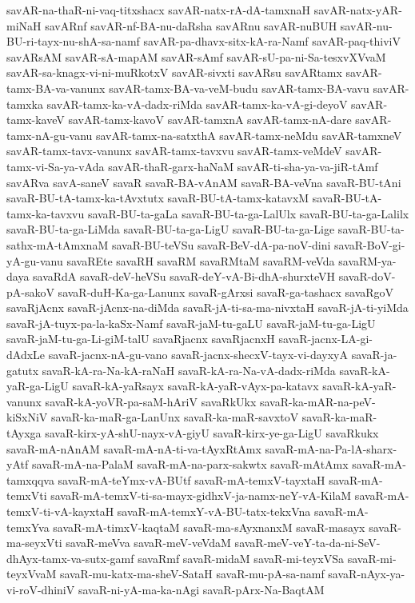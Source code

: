 {savAR-na-thaR-ni-vaq-titxshacx
savAR-natx-rA-dA-tamxnaH
savAR-natx-yAR-miNaH
savARnf
savAR-nf-BA-nu-daRsha
savARnu
savAR-nuBUH
savAR-nu-BU-ri-tayx-nu-shA-sa-namf
savAR-pa-dhavx-sitx-kA-ra-Namf
savAR-paq-thiviV
savARsAM
savAR-sA-mapAM
savAR-sAmf
savAR-sU-pa-ni-Sa-tesxvXVvaM
savAR-sa-knagx-vi-ni-muRkotxV
savAR-sivxti
savARsu
savARtamx
savAR-tamx-BA-va-vanunx
savAR-tamx-BA-va-veM-budu
savAR-tamx-BA-vavu
savAR-tamxka
savAR-tamx-ka-vA-dadx-riMda
savAR-tamx-ka-vA-gi-deyoV
savAR-tamx-kaveV
savAR-tamx-kavoV
savAR-tamxnA
savAR-tamx-nA-dare
savAR-tamx-nA-gu-vanu
savAR-tamx-na-satxthA
savAR-tamx-neMdu
savAR-tamxneV
savAR-tamx-tavx-vanunx
savAR-tamx-tavxvu
savAR-tamx-veMdeV
savAR-tamx-vi-Sa-ya-vAda
savAR-thaR-garx-haNaM
savAR-ti-sha-ya-va-jiR-tAmf
savARva
savA-saneV
savaR
savaR-BA-vAnAM
savaR-BA-veVna
savaR-BU-tAni
savaR-BU-tA-tamx-ka-tAvxtutx
savaR-BU-tA-tamx-katavxM
savaR-BU-tA-tamx-ka-tavxvu
savaR-BU-ta-gaLa
savaR-BU-ta-ga-LalUlx
savaR-BU-ta-ga-Lalilx
savaR-BU-ta-ga-LiMda
savaR-BU-ta-ga-LigU
savaR-BU-ta-ga-Lige
savaR-BU-ta-sathx-mA-tAmxnaM
savaR-BU-teVSu
savaR-BeV-dA-pa-noV-dini
savaR-BoV-gi-yA-gu-vanu
savaREte
savaRH
savaRM
savaRMtaM
savaRM-veVda
savaRM-ya-daya
savaRdA
savaR-deV-heVSu
savaR-deY-vA-Bi-dhA-shurxteVH
savaR-doV-pA-sakoV
savaR-duH-Ka-ga-Lanunx
savaR-gArxsi
savaR-ga-tashacx
savaRgoV
savaRjAcnx
savaR-jAcnx-na-diMda
savaR-jA-ti-sa-ma-nivxtaH
savaR-jA-ti-yiMda
savaR-jA-tuyx-pa-la-kaSx-Namf
savaR-jaM-tu-gaLU
savaR-jaM-tu-ga-LigU
savaR-jaM-tu-ga-Li-giM-talU
savaRjacnx
savaRjacnxH
savaR-jacnx-LA-gi-dAdxLe
savaR-jacnx-nA-gu-vano
savaR-jacnx-shecxV-tayx-vi-dayxyA
savaR-ja-gatutx
savaR-kA-ra-Na-kA-raNaH
savaR-kA-ra-Na-vA-dadx-riMda
savaR-kA-yaR-ga-LigU
savaR-kA-yaRsayx
savaR-kA-yaR-vAyx-pa-katavx
savaR-kA-yaR-vanunx
savaR-kA-yoVR-pa-saM-hAriV
savaRkUkx
savaR-ka-mAR-na-peV-kiSxNiV
savaR-ka-maR-ga-LanUnx
savaR-ka-maR-savxtoV
savaR-ka-maR-tAyxga
savaR-kirx-yA-shU-nayx-vA-giyU
savaR-kirx-ye-ga-LigU
savaRkukx
savaR-mA-nAnAM
savaR-mA-nA-ti-va-tAyxRtAmx
savaR-mA-na-Pa-lA-sharx-yAtf
savaR-mA-na-PalaM
savaR-mA-na-parx-sakwtx
savaR-mAtAmx
savaR-mA-tamxqqva
savaR-mA-teYmx-vA-BUtf
savaR-mA-temxV-tayxtaH
savaR-mA-temxVti
savaR-mA-temxV-ti-sa-mayx-gidhxV-ja-namx-neY-vA-KilaM
savaR-mA-temxV-ti-vA-kayxtaH
savaR-mA-temxY-vA-BU-tatx-tekxVna
savaR-mA-temxYva
savaR-mA-timxV-kaqtaM
savaR-ma-sAyxnanxM
savaR-masayx
savaR-ma-seyxVti
savaR-meVva
savaR-meV-veVdaM
savaR-meV-veY-ta-da-ni-SeV-dhAyx-tamx-va-sutx-gamf
savaRmf
savaR-midaM
savaR-mi-teyxVSa
savaR-mi-teyxVvaM
savaR-mu-katx-ma-sheV-SataH
savaR-mu-pA-sa-namf
savaR-nAyx-ya-vi-roV-dhiniV
savaR-ni-yA-ma-ka-nAgi
savaR-pArx-Na-BaqtAM
}
